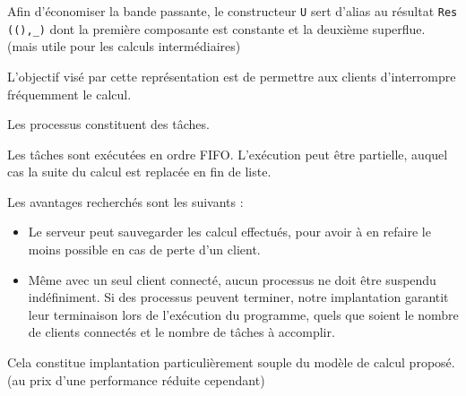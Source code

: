 \documentclass[11pt]{article}
\begin{document}
Afin d'\'economiser la bande passante,
le constructeur {\tt U} sert d'alias au r\'esultat {\tt Res ((),\_)}
dont la premi\`ere composante est constante et la deuxi\`eme superflue.
(mais utile pour les calculs interm\'ediaires)

\smallskip

L'objectif vis\'e par cette repr\'esentation est
de permettre aux clients d'interrompre fr\'equemment le calcul.

Les processus constituent des t\^aches.

Les t\^aches sont ex\'ecut\'ees en ordre FIFO.
L'ex\'ecution peut \^etre partielle,
auquel cas la suite du calcul est replac\'ee en fin de liste.

\smallskip

Les avantages recherch\'es sont les suivants :

\begin{itemize}
  \item Le serveur peut sauvegarder les calcul effectu\'es,
    pour avoir \`a en refaire le moins possible en cas de perte d'un client.
  \item M\^eme avec un seul client connect\'e,
    aucun processus ne doit \^etre suspendu ind\'efiniment.
    Si des processus peuvent terminer, notre implantation garantit leur
    terminaison lors de l'ex\'ecution du programme, quels que soient
    le nombre de clients connect\'es et le nombre de t\^aches \`a accomplir.
\end{itemize}

Cela constitue implantation particuli\`erement souple
du mod\`ele de calcul propos\'e.
(au prix d'une performance r\'eduite cependant)
\end{document}
